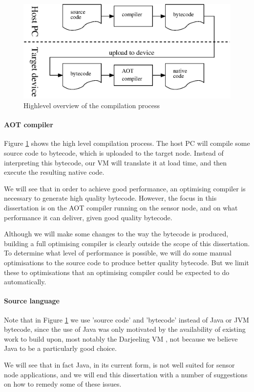 \begin{figure}
\centering
\includegraphics[width=0.6\linewidth]{compilation-process-highlevel.eps}
\caption{Highlevel overview of the compilation process}
\label{fig-compilation-process-highlevel}
\end{figure}

\paragraph{AOT compiler}
Figure \ref{fig-compilation-process-highlevel} shows the high level compilation process. The host PC will compile some source code to bytecode, which is uploaded to the target node. Instead of interpreting this bytecode, our VM will translate it at load time, and then execute the resulting native code.

We will see that in order to achieve good performance, an optimising compiler is necessary to generate high quality bytecode. However, the focus in this dissertation is on the AOT compiler running on the sensor node, and on what performance it can deliver, given good quality bytecode.

Although we will make some changes to the way the bytecode is produced, building a full optimising compiler is clearly outside the scope of this dissertation. To determine what level of performance is possible, we will do some manual optimisations to the source code to produce better quality bytecode. But we limit these to optimisations that an optimising compiler could be expected to do automatically.

\paragraph{Source language}
Note that in Figure \ref{fig-compilation-process-highlevel} we use 'source code' and 'bytecode' instead of Java or JVM bytecode, since the use of Java was only motivated by the availability of existing work to build upon, most notably the Darjeeling VM \cite{Brouwers:2009cj}, not because we believe Java to be a particularly good choice.

We will see that in fact Java, in its current form, is not well suited for sensor node applications, and we will end this dissertation with a number of suggestions on how to remedy some of these issues.


